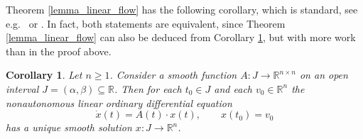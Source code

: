 \documentclass{amsart}
\theoremstyle{plain}
\newtheorem{corollary}[theorem]{Corollary}
\begin{document}
\bigskip


Theorem  \ref{lemma_linear_flow} has the following corollary, which is standard, see e.g.~\cite[IV,]{Lang99} or \cite[Theorem 4.31]{Lee18}.
In fact, both statements are equivalent, since Theorem  \ref{lemma_linear_flow} can also be deduced from Corollary \ref{lemma_linear_nODE}, but with more work than in the proof above.
\begin{corollary}\label{lemma_linear_nODE}
 Let $n\geq 1$.
Consider a smooth function $A\colon J\to \mathbb R^{n\times n}$ on an open interval $J=(\alpha, \beta)\subseteq \mathbb R$. Then for each $t_0\in J$ and each $v_0\in \mathbb R^n$ the nonautonomous linear ordinary differential equation 
\[ \dot x(t)=A(t)\cdot x(t), \qquad x(t_0)=v_0
\]
has a unique smooth solution $x\colon J\to \mathbb R^n$.
\end{corollary}
\end{document}
